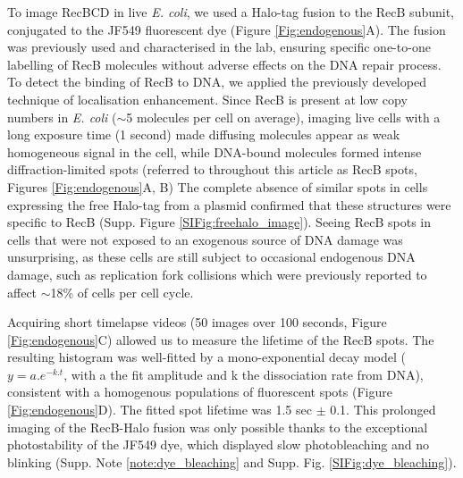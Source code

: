 To image Rec\-BCD in live \textit{E. coli}, we used a Halo-tag fusion to the RecB subunit, conjugated to the JF549 fluorescent dye (Figure \ref{Fig:endogenous}A). The fusion was previously used and characterised in the lab, ensuring specific one-to-one labelling of RecB molecules without adverse effects on the DNA repair process.\cite{Lepore2019a} To detect the binding of RecB to DNA, we applied the previously developed technique of localisation enhancement.\cite{Yu2006, Elf2007}  Since RecB is present at low copy numbers in \textit{E. coli} ($\sim$5 molecules per cell on average\cite{Lepore2019a}), imaging live cells with a long exposure time (1 second) made diffusing molecules appear as weak homogeneous signal in the cell, while DNA-bound molecules formed intense diffraction-limited spots (referred to throughout this article as RecB spots, Figures \ref{Fig:endogenous}A, B) The complete absence of similar spots in cells expressing the free Halo-tag from a plasmid confirmed that these structures were specific to RecB (Supp. Figure \ref{SIFig:freehalo_image}). Seeing RecB spots in cells that were not exposed to an exogenous source of DNA damage was unsurprising, as these cells are still subject to occasional endogenous DNA damage, such as replication fork collisions which were previously reported to affect $\sim$18\% of cells per cell cycle.\cite{Sinha2018}

Acquiring short timelapse videos (50 images over 100 seconds, Figure \ref{Fig:endogenous}C) allowed us to measure the lifetime of the RecB spots. The resulting histogram was well-fitted by a mono-exponential decay model ($y=a.e^{-k.t}$, with a the fit amplitude and k the dissociation rate from DNA), consistent with a homogenous populations of fluorescent spots (Figure \ref{Fig:endogenous}D). The fitted spot lifetime was 1.5 sec $\pm$ 0.1. This prolonged imaging of the RecB-Halo fusion was only possible thanks to the exceptional photostability of the JF549 dye, which displayed slow photobleaching and no blinking (Supp. Note \ref{note:dye_bleaching} and Supp. Fig. \ref{SIFig:dye_bleaching}). 

